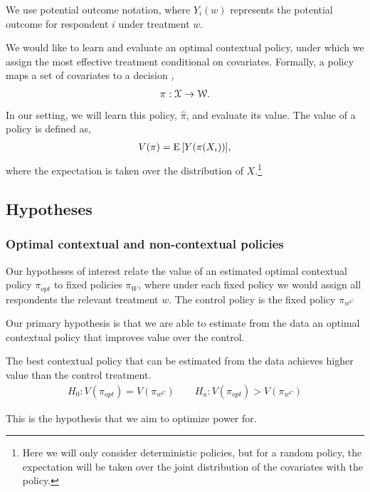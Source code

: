 \documentclass[letterpaper, 12pt, parskip=full,DIV=10]{scrartcl}
\begin{document}
We use potential outcome notation, where $Y_i(w)$ represents the potential outcome for respondent $i$ under treatment $w$.%


We would like to learn and evaluate an optimal contextual policy, under which we assign the most effective treatment conditional on covariates. Formally, a policy maps a set of covariates to a decision \citep{athey2017efficient}, %
\begin{align}
  \pi: {\EuScript X} \rightarrow {\EuScript W}. 
  \label{eq:policy}
\end{align}
In our setting, we will learn this policy, $\hat \pi$, and evaluate its value. The value of a policy is defined as, 
\begin{align}
V(\pi) =  {\textrm E}\,[Y(\pi(X_{i}))],
  \label{eq:policy_value}
\end{align}
where the expectation is taken over the distribution of $X$.\footnote{Here we will only consider deterministic policies, but for a random policy, the expectation will be taken over the joint distribution of the covariates with the policy. }

\subsection{Hypotheses}\label{hypotheses}

\subsubsection{Optimal contextual and non-contextual policies}\label{policiesbest}
Our hypotheses of interest relate the value of an estimated optimal contextual policy $\pi_{opt}$ to fixed policies $\pi_{W}$, where under each fixed policy we would assign all respondents the relevant treatment $w$. The control policy is the fixed policy $\pi_{w^{C}}$

Our primary hypothesis is that we are able to estimate from the data an optimal contextual policy that improves value over the control. 
  \begin{hypothesis}
  The best contextual policy that can be estimated from the data achieves higher value than the control treatment. \label{eq:optctr}
\begin{align}
  H_{0}: V(\pi_{opt}) = V(\pi_{w^{C}}) \qquad H_{a}:  V(\pi_{opt}) > V(\pi_{w^{C}})
\end{align}
\end{hypothesis}
This is the hypothesis that we aim to optimize power for. 
\end{document}
